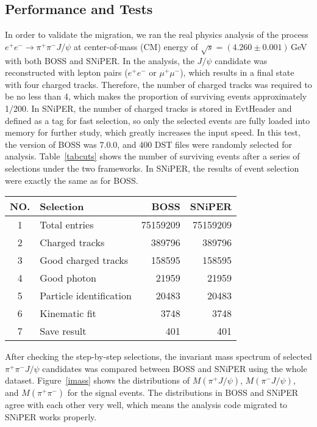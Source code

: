\documentclass[a4paper,10pt,twoside]{cpc-hepnp}
\begin{document}
\begin{CJK*}{GB}{gbsn}
\begin{multicols}{2}
\section{Performance and Tests}

In order to validate the migration, we ran the real physics analysis of the process $e^{+}e^{-} \rightarrow \pi^{+}\pi^{-}J/\psi$ at center-of-mass (CM) energy of $\sqrt{s} = (4.260\pm0.001)$\,GeV~\cite{2013PhRvL.110y2001A} with both BOSS and SNiPER.
In the analysis, the $J/\psi$ candidate was reconstructed with lepton pairs ($e^{+}e^{-}$ or $\mu^+\mu^-$), which results in a final state with four charged tracks.
Therefore, the number of charged tracks was required to be no less than 4, which makes the proportion of surviving events approximately 1/200.
In SNiPER, the number of charged tracks is stored in EvtHeader and defined as a tag for fast selection, so only the selected events are fully loaded into memory for further study, which greatly increases the input speed.
In this test, the version of BOSS was $7.0.0$, and 400 DST files were randomly selected for analysis.
Table~\ref{tabcuts} shows the number of surviving events after a series of selections under the two frameworks.
In SNiPER, the results of event selection were exactly the same as for BOSS.

\begin{center}
\footnotesize
\begin{tabular*}{76mm}{clrr}
\toprule
NO.  & Selection                         & BOSS     &  SNiPER   \\ \midrule
1 & Total entries       & 75159209 &  75159209 \\
2 & Charged tracks      & 389796   &  389796   \\
3 & Good charged tracks & 158595   &  158595   \\
4 & Good photon         & 21959    &  21959    \\
5 & Particle identification  & 20483  &  20483 \\
6 & Kinematic fit            & 3748   &  3748  \\
7 & Save result              & 401    &  401   \\ \bottomrule
\end{tabular*}
\vspace{0mm}
\end{center}


After checking the step-by-step selections, the invariant mass spectrum of selected $\pi^{+}\pi^{-}J/\psi$ candidates was compared between BOSS and SNiPER using the  whole dataset.
Figure~\ref{imass} shows the distributions of $M(\pi^+J/\psi)$, $M(\pi^-J/\psi)$, and $M(\pi^+\pi^-)$ for the signal events.
The distributions in BOSS and SNiPER agree with each other very well, which means the analysis code migrated to SNiPER works properly.


\end{multicols}
\end{CJK*}
\end{document}
